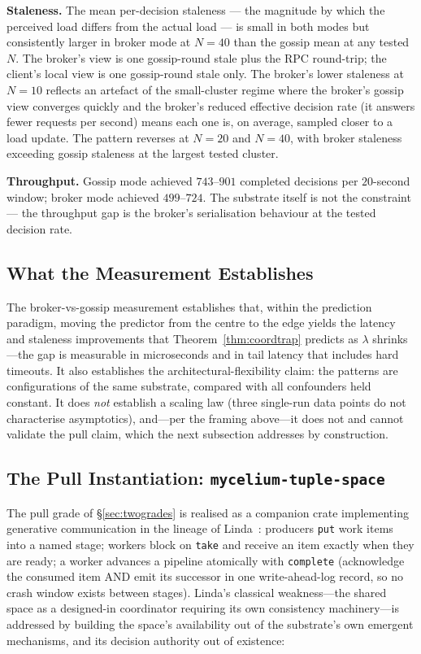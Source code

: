 \documentclass[11pt]{article}
\theoremstyle{definition}
\theoremstyle{plain}
\theoremstyle{plain}
\begin{document}
\textbf{Staleness.} The mean per-decision staleness — the magnitude by which
the perceived load differs from the actual load — is small in both modes
but consistently larger in broker mode at $N{=}40$ than the gossip mean
at any tested $N$. The broker's view is one gossip-round stale plus the
RPC round-trip; the client's local view is one gossip-round stale only.
The broker's lower staleness at $N{=}10$ reflects an artefact of the
small-cluster regime where the broker's gossip view converges quickly and
the broker's reduced effective decision rate (it answers fewer requests
per second) means each one is, on average, sampled closer to a load update.
The pattern reverses at $N{=}20$ and $N{=}40$, with broker staleness
exceeding gossip staleness at the largest tested cluster.

\textbf{Throughput.} Gossip mode achieved $743$--$901$ completed decisions
per $20$-second window; broker mode achieved $499$--$724$. The substrate
itself is not the constraint — the throughput gap is the broker's
serialisation behaviour at the tested decision rate.

\subsection{What the Measurement Establishes}

The broker-vs-gossip measurement establishes that, within the prediction
paradigm, moving the predictor from the centre to the edge yields the
latency and staleness improvements that Theorem~\ref{thm:coordtrap}
predicts as $\lambda$ shrinks---the gap is measurable in microseconds and
in tail latency that includes hard timeouts. It also establishes the
architectural-flexibility claim: the patterns are configurations of the
same substrate, compared with all confounders held constant. It does
\emph{not} establish a scaling law (three single-run data points do not
characterise asymptotics), and---per the framing above---it does not and
cannot validate the pull claim, which the next subsection addresses by
construction.

\subsection{The Pull Instantiation: \texttt{mycelium-tuple-space}}
\label{sec:pullinstantiation}

The pull grade of \S\ref{sec:twogrades} is realised as a companion crate
implementing generative communication in the lineage of
Linda~\cite{gelernter1985}: producers \texttt{put} work items into a named
stage; workers block on \texttt{take} and receive an item exactly when
they are ready; a worker advances a pipeline atomically with
\texttt{complete} (acknowledge the consumed item AND emit its successor in
one write-ahead-log record, so no crash window exists between stages).
Linda's classical weakness---the shared space as a designed-in
coordinator requiring its own consistency machinery---is addressed by
building the space's availability out of the substrate's own emergent
mechanisms, and its decision authority out of existence:
\end{document}
